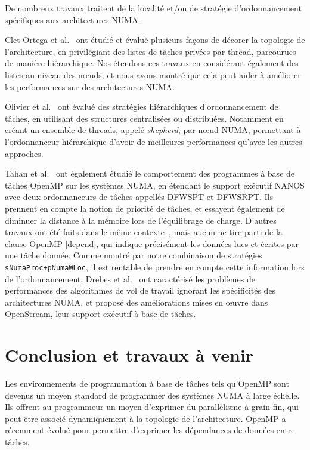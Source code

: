 \documentclass[parallelisme]{compas2016}
\begin{document}
De nombreux travaux traitent de la localité et/ou de stratégie d'ordonnancement
spécifiques aux architectures NUMA.

Clet-Ortega et al.~\cite{DBLP:conf/europar/Clet-OrtegaCP14} ont étudié et évalué plusieurs
façons de décorer la topologie de l'architecture, en privilégiant des listes de tâches
privées par thread, parcourues de manière hiérarchique. Nos étendons ces travaux
en considérant également des listes au niveau des nœuds, et nous avons montré
que cela peut aider à améliorer les performances sur des architectures NUMA.

Olivier et al.~\cite{DBLP:journals/ijhpca/OlivierPWSP12} ont évalué des stratégies
hiérarchiques d'ordonnancement de tâches, en utilisant des structures centralisées
ou distribuées. Notamment en créant un ensemble de threads, appelé \emph{shepherd}, par
nœud NUMA, permettant à l'ordonnanceur hiérarchique d'avoir de meilleures performances
qu'avec les autres approches.

Tahan et al.~\cite{DBLP:journals/corr/Tahan14} ont également étudié le comportement
des programmes à base de tâches OpenMP sur les systèmes NUMA, en étendant le
support exécutif NANOS avec deux ordonnanceurs de tâches appellés DFWSPT et DFWSRPT.
Ils prennent en compte la notion de priorité de tâches, et essayent également de diminuer
la distance à la mémoire lors de l'équilibrage de charge.
D'autres travaux ont été faits dans le même contexte~\cite{DBLP:conf/europar/TerbovenSCM12,DBLP:journals/corr/abs-1101-0093},
mais aucun ne tire parti de la clause OpenMP |depend|, qui indique précisément les
données lues et écrites par une tâche donnée. Comme montré par notre combinaison
de stratégies \verb/sNumaProc+pNumaWLoc/, il est rentable de prendre en compte
cette information lors de l'ordonnancement.
Drebes et al.~\cite{LIP610333} ont caractérisé les problèmes de performances des
algorithmes de vol de travail ignorant les spécificités des architectures NUMA,
et proposé des améliorations mises en œuvre dans OpenStream, leur support exécutif à base de tâches.


\section{Conclusion et travaux à venir}

Les environnements de programmation à base de tâches tels qu'OpenMP sont devenus
un moyen standard de programmer des systèmes NUMA à large échelle.
Ils offrent au programmeur un moyen d'exprimer du parallélisme à grain fin,
qui peut être associé dynamiquement à la topologie de l'architecture.
OpenMP a récemment évolué pour permettre d'exprimer les dépendances de données
entre tâches.
\end{document}

